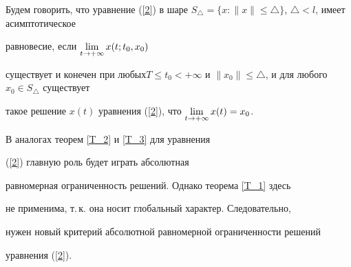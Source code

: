 \begin{defn} \label{O_2}


Будем говорить, что уравнение (\ref{2}) в шаре $S_{\triangle}=


\lbrace x:\|x\| \leq \triangle\rbrace$, $\triangle<l $, имеет асимптотическое


равновесие, если $\lim \limits_{t \rightarrow +\infty}x(t;t_{0},x_{0})$


существует и конечен при любых\linebreak $T\leq t_{0}<+\infty$ и $\|x_{0}\|


\leq \triangle$, и для любого $x_{0}\in S_{\triangle}$ существует


такое решение $x(t)$ уравнения (\ref{2}), что $\lim \limits_{t\rar


+\infty}x(t)=x_{0}$.


\end{defn}





В аналогах теорем \ref{T_2} и \ref{T_3} для уравнения


(\ref{2}) главную роль будет играть абсолютная


равномерная ограниченность решений. Однако теорема \ref{T_1} здесь


не применима, т.\,к. она носит глобальный характер. Следовательно,


нужен новый критерий абсолютной равномерной ограниченности решений


уравнения (\ref{2}).





